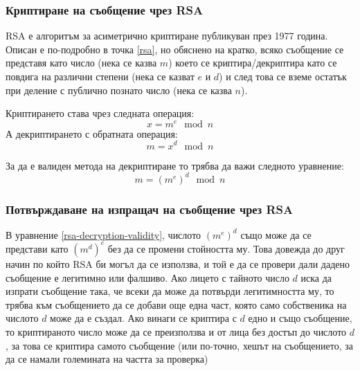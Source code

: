     \subsubsection{Криптиране на съобщение чрез RSA}
    RSA е алгоритъм за асиметрично криптиране публикуван през 1977 година. Описан е по-подробно в точка \ref{rsa}, но обяснено на кратко, всяко съобщение се представя като число (нека се казва $m$) което се криптира/декриптира като се повдига на различни степени (нека се казват $e$ и $d$) и след това се вземе остатък при деление с публично познато число (нека се казва $n$).

    Криптирането става чрез следната операция:
    \begin{equation}
      x = m^e \mod n
      \label{rsa-raising-to-e}
    \end{equation}
    А декриптирането с обратната операция:
    \begin{equation}
      m = x^d \mod n
      \label{rsa-raising-to-d}
    \end{equation}

    За да е валиден метода на декриптиране то трябва да важи следното уравнение:
    \begin{equation}
      m = (m^e)^d \mod n
      \label{rsa-decryption-validity}
    \end{equation}

    \subsubsection{Потвърждаване на изпращач на съобщение чрез RSA}
    В уравнение \ref{rsa-decryption-validity}, числото $(m^e)^d$ също може да се представи като $(m^d)^e$ без да се промени стойността му. Това довежда до друг начин по който RSA би могъл да се използва, и той е да се провери дали дадено съобщение е легитимно или фалшиво. Ако лицето с тайното число $d$ иска да изпрати съобщение така, че всеки да може да потвърди легитимността му, то трябва към съобщението да се добави още една част, която само собственика на числото $d$ може да е създал. Ако винаги се криптира с $d$ едно и също съобщение, то криптираното число може да се преизползва и от лица без достъп до числото $d$, за това се криптира самото съобщение (или по-точно, хешът на съобщението, за да се намали големината на частта за проверка)

